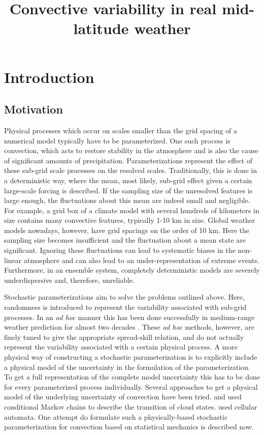 \documentclass[a4paper, 12pt]{article}
\title{Convective variability in real mid-latitude weather}
\begin{document}
\maketitle
	
\section{Introduction}

\subsection{Motivation}
Physical processes which occur on scales smaller than the grid spacing of a numerical model typically have to be parameterized. One such process is convection, which acts to restore stability in the atmosphere and is also the cause of significant amounts of precipitation. Parameterizations represent the effect of these sub-grid scale processes on the resolved scales. Traditionally, this is done in a deterministic way, where the mean, most likely, sub-grid effect given a certain large-scale forcing is described. If the sampling size of the unresolved features is large enough, the fluctuations about this mean are indeed small and negligible. For example, a grid box of a climate model with several hundreds of kilometers in size contains many convective features, typically 1-10 km in size. Global weather models nowadays, however, have grid spacings on the order of 10 km. Here the sampling size becomes insufficient and the fluctuation about a mean state are significant. Ignoring these fluctuations can lead to systematic biases in the non-linear atmosphere \citep[e.g.][]{Berner2016} and can also lead to an under-representation of extreme events. Furthermore, in an ensemble system, completely deterministic models are severely underdispersive and, therefore, unreliable. 

Stochastic parameterizations aim to solve the problems outlined above. Here, randomness is introduced to represent the variability associated with sub-grid processes. In an \textit{ad hoc} manner this has been done successfully in medium-range weather prediction for almost two decades \citep{Buizza1999, Berner2009a}. These \textit{ad hoc} methods, however, are finely tuned to give the appropriate spread-skill relation, and do not actually represent the variability associated with a certain physical process. A more physical way of constructing a stochastic parameterization is to explicitly include a physical model of the uncertainty in the formulation of the parameterization. To get a full representation of the complete model uncertainty this has to be done for every parameterized process individually. 
Several approaches to get a physical model of the underlying uncertainty of convection have been tried. \cite{Dorrestijn2015} and \cite{Gottwald2016} used conditional Markov chains to describe the transition of cloud states. \cite{Bengtsson2013} used cellular automata. One attempt do formulate such a physically-based stochastic parameterization for convection based on statistical mechanics is described now. 
\end{document}
